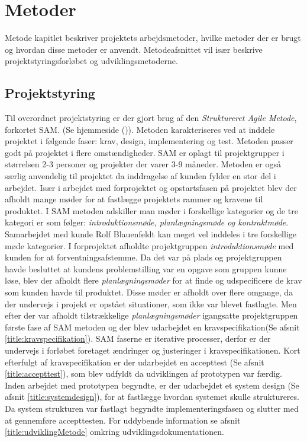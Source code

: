 \chapter{Metoder}
Metode kapitlet beskriver projektets arbejdsmetoder, hvilke metoder der er brugt og hvordan disse metoder er anvendt. Metodeafsnittet vil især beskrive projektstyringsforløbet og udviklingsmetoderne. 

\section{Projektstyring} \label{title:projektstyring}
Til overordnet projektstyring er der gjort brug af den \textit{Struktureret Agile Metode}, forkortet SAM. (Se hjemmeside (\cite{RefWorks:35})). Metoden karakteriseres ved at inddele projektet i følgende faser: krav, design, implementering og test. Metoden passer godt på projektet i flere omstændigheder. SAM er oplagt til projektgrupper i størrelsen 2-3 personer og projekter der varer 3-9 måneder. Metoden er også særlig anvendelig til projektet da inddragelse af kunden fylder en stor del i arbejdet. 
Især i arbejdet med forprojektet og opstartsfasen på projektet blev der afholdt mange møder for at fastlægge projektets rammer og kravene til produktet. I SAM metoden adskiller man møder i forskellige kategorier og de tre kategori er som følger: \textit{introduktionsmøde, planlægningsmøde og kontraktmøde}. Samarbejdet med kunde Rolf Blauenfeldt kan meget vel inddeles i tre forskellige møde kategorier. I forprojektet afholdte projektgruppen \textit{introduktionsmøde} med kunden for at forventningsafstemme. Da det var på plads og projektgruppen havde besluttet at kundens problemstilling var en opgave som gruppen kunne løse, blev der afholdt flere \textit{planlægningsmøder} for at finde og udspecificere de  krav som kunden havde til produktet. Disse møder er afholdt over flere omgange, da der undervejs i projekt er opstået situationer, som ikke var blevet fastlagte. Men efter der var afholdt tilstrækkelige \textit{planlægningsmøder} igangsatte projektgruppen første fase af SAM metoden og der blev udarbejdet en kravspecifikation(Se afsnit \ref{title:kravspecifikation}). SAM faserne er iterative processer, derfor er der undervejs i forløbet  foretaget ændringer og justeringer i kravspecifikationen. Kort efterfulgt af kravspecifikation er der udarbejdet en accepttest (Se afsnit \ref{title:accepttest}), som blev udfyldt da udviklingen af prototypen var færdig. Inden arbejdet med prototypen begyndte, er der udarbejdet et system design (Se afsnit \ref{title:systemdesign}), for at fastlægge hvordan systemet skulle struktureres. Da system strukturen var fastlagt begyndte implementeringsfasen og slutter med at gennemføre accepttesten. For uddybende information se afsnit \ref{title:udviklingMetode} omkring udviklingsdokumentationen.

